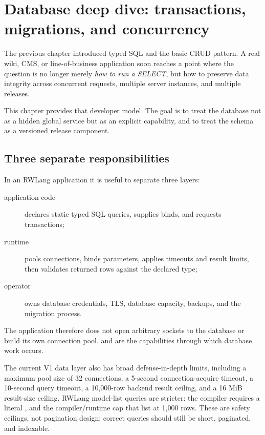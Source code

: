 \chapter{Database deep dive: transactions, migrations, and concurrency}\label{ch:db-deep-dive}

The previous chapter introduced typed SQL and the basic CRUD pattern. A real wiki, CMS, or line-of-business application soon reaches a point where the question is no longer merely \emph{how to run a SELECT}, but how to preserve data integrity across concurrent requests, multiple server instances, and multiple releases.

This chapter provides that developer model. The goal is to treat the database not as a hidden global service but as an explicit capability, and to treat the schema as a versioned release component.

\section{Three separate responsibilities}

In an RWLang application it is useful to separate three layers:

\begin{description}
\item[application code] declares static typed SQL queries, supplies binds, and requests transactions;
\item[runtime] pools connections, binds parameters, applies timeouts and result limits, then validates returned rows against the declared type;
\item[operator] owns database credentials, TLS, database capacity, backups, and the migration process.
\end{description}

The application therefore does not open arbitrary sockets to the database or build its own connection pool.  and  are the capabilities through which database work occurs.

The current V1 data layer also has broad defense-in-depth limits, including a maximum pool size of 32 connections, a 5-second connection-acquire timeout, a 10-second query timeout, a 10,000-row backend result ceiling, and a 16 MiB result-size ceiling. RWLang model-list queries are stricter: the compiler requires a literal , and the compiler/runtime cap that list at 1,000 rows. These are safety ceilings, not pagination design; correct queries should still be short, paginated, and indexable.

